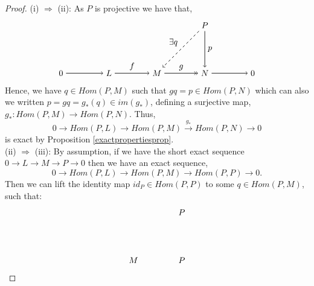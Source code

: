 \documentclass[11.5pt, twoside, a4paper, titlepage]{report}
\theoremstyle{definition}
\theoremstyle{plain}
\begin{document}
\begin{proof} (i) $\Rightarrow$ (ii): As $P$ is projective we have that,
\begin{equation*}
\begin{tikzpicture}[->,-latex, auto, main path/.style={->, semithick}, main node/.style={}]
\node	[main node]		(1) at (0,0)		{$M$};
\node	[main node]		(2) at (2,0)		{$N$};
\node [main node]		(3) at (2,2)		{$P$};
\node [main node]		(4) at (-2, 0)		{$L$};
\node [main node]		(5) at (-4, 0)		{$0$};
\node [main node]		(6) at (4, 0)		{$0$};

\draw (1) edge [->>, semithick] node [auto] {$g$} (2);
\draw (3) edge [main path] node [auto] {$p$} (2);
\draw (3) edge [dashed, ->, semithick] node [auto, swap] {$\exists q$} (1);
\draw (4) edge [main path] node [auto] {$f$} (1);
\draw (5) edge [main path] (4);
\draw (2) edge [main path] (6);
\end{tikzpicture}
\end{equation*}
Hence, we have $q\in Hom(P,M)$ such that $gq=p\in Hom(P,N)$ which can also we written $p=gq=g_{\ast}(q)\in im(g_{\ast})$, defining a surjective map, $g_{\ast}: Hom(P,M) \to Hom(P,N)$. Thus,
\begin{equation*}
0\xrightarrow{}Hom(P,L) \xrightarrow{}Hom(P,M)\xrightarrow{g_{\ast}}Hom(P,N)\xrightarrow{}0
\end{equation*}
is exact by Proposition \ref{exactpropertiesprop}.\\
(ii) $\Rightarrow$ (iii): By assumption, if we have the short exact sequence $0\xrightarrow{}L\xrightarrow{}M\xrightarrow{}P\xrightarrow{}0$ then we have an exact sequence,
\begin{equation*}
0\xrightarrow{}Hom(P,L) \xrightarrow{}Hom(P,M)\xrightarrow{}Hom(P,P)\xrightarrow{}0.
\end{equation*}
Then we can lift the identity map $id_P\in Hom(P,P)$ to some $q\in Hom(P,M)$, such that:
\begin{equation*}
\begin{tikzpicture}[->,-latex, auto, main path/.style={->, semithick}, main node/.style={}]
\node	[main node]		(1) at (0,0)		{$M$};
\node	[main node]		(2) at (2,0)		{$P$};
\node [main node]		(3) at (2,2)		{$P$};


\end{tikzpicture}
\end{equation*}
\end{proof}
\end{document}
